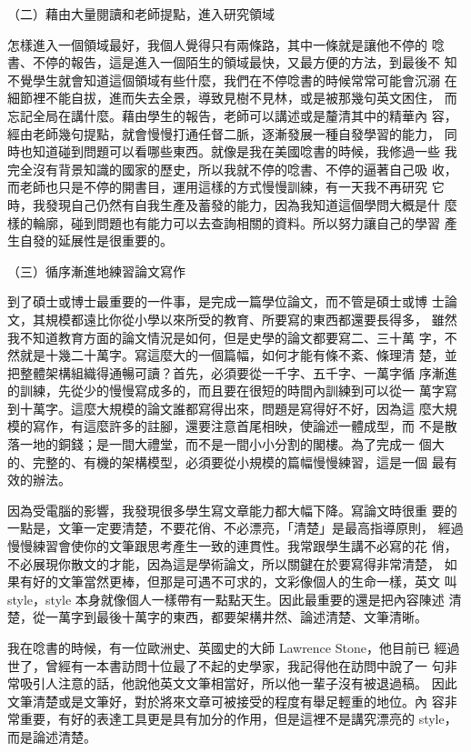 （二）藉由大量閱讀和老師提點，進入研究領域

怎樣進入一個領域最好，我個人覺得只有兩條路，其中一條就是讓他不停的
唸書、不停的報告，這是進入一個陌生的領域最快，又最方便的方法，到最後不
知不覺學生就會知道這個領域有些什麼，我們在不停唸書的時候常常可能會沉溺
在細節裡不能自拔，進而失去全景，導致見樹不見林，或是被那幾句英文困住，
而忘記全局在講什麼。藉由學生的報告，老師可以講述或是釐清其中的精華內
容，經由老師幾句提點，就會慢慢打通任督二脈，逐漸發展一種自發學習的能力，
同時也知道碰到問題可以看哪些東西。就像是我在美國唸書的時候，我修過一些
我完全沒有背景知識的國家的歷史，所以我就不停的唸書、不停的逼著自己吸
收，而老師也只是不停的開書目，運用這樣的方式慢慢訓練，有一天我不再研究
它時，我發現自己仍然有自我生產及蓄發的能力，因為我知道這個學問大概是什
麼樣的輪廓，碰到問題也有能力可以去查詢相關的資料。所以努力讓自己的學習
產生自發的延展性是很重要的。 

（三）循序漸進地練習論文寫作

到了碩士或博士最重要的一件事，是完成一篇學位論文，而不管是碩士或博
士論文，其規模都遠比你從小學以來所受的教育、所要寫的東西都還要長得多，
雖然我不知道教育方面的論文情況是如何，但是史學的論文都要寫二、三十萬
字，不然就是十幾二十萬字。寫這麼大的一個篇幅，如何才能有條不紊、條理清
楚，並把整體架構組織得通暢可讀？首先，必須要從一千字、五千字、一萬字循
序漸進的訓練，先從少的慢慢寫成多的，而且要在很短的時間內訓練到可以從一
萬字寫到十萬字。這麼大規模的論文誰都寫得出來，問題是寫得好不好，因為這
麼大規模的寫作，有這麼許多的註腳，還要注意首尾相映，使論述一體成型，而
不是散落一地的銅錢；是一間大禮堂，而不是一間小小分割的閣樓。為了完成一
個大的、完整的、有機的架構模型，必須要從小規模的篇幅慢慢練習，這是一個
最有效的辦法。

因為受電腦的影響，我發現很多學生寫文章能力都大幅下降。寫論文時很重
要的一點是，文筆一定要清楚，不要花俏、不必漂亮，「清楚」是最高指導原則，
經過慢慢練習會使你的文筆跟思考產生一致的連貫性。我常跟學生講不必寫的花
俏，不必展現你散文的才能，因為這是學術論文，所以關鍵在於要寫得非常清楚，
如果有好的文筆當然更棒，但那是可遇不可求的，文彩像個人的生命一樣，英文
叫 style，style 本身就像個人一樣帶有一點點天生。因此最重要的還是把內容陳述
清楚，從一萬字到最後十萬字的東西，都要架構井然、論述清楚、文筆清晰。

我在唸書的時候，有一位歐洲史、英國史的大師 Lawrence Stone，他目前已
經過世了，曾經有一本書訪問十位最了不起的史學家，我記得他在訪問中說了一
句非常吸引人注意的話，他說他英文文筆相當好，所以他一輩子沒有被退過稿。
因此文筆清楚或是文筆好，對於將來文章可被接受的程度有舉足輕重的地位。內
容非常重要，有好的表達工具更是具有加分的作用，但是這裡不是講究漂亮的
style，而是論述清楚。 


